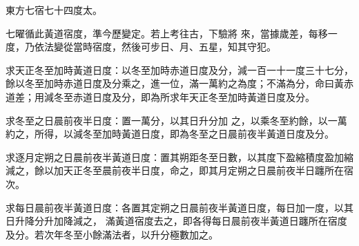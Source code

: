 \begin{pinyinscope}
 東方七宿七十四度太。



 七曜循此黃道宿度，準今歷變定。若上考往古，下驗將
 來，當據歲差，每移一度，乃依法變從當時宿度，然後可步日、月、五星，知其守犯。



 求天正冬至加時黃道日度：以冬至加時赤道日度及分，減一百一十一度三十七分，餘以冬至加時赤道日度及分乘之，進一位，滿一萬約之為度；不滿為分，命曰黃赤道差；用減冬至赤道日度及分，即為所求年天正冬至加時黃道日度及分。



 求冬至之日晨前夜半日度：置一萬分，以其日升分加
 之，以乘冬至約餘，以一萬約之，所得，以減冬至加時黃道日度，即為冬至之日晨前夜半黃道日度及分。



 求逐月定朔之日晨前夜半黃道日度：置其朔距冬至日數，以其度下盈縮積度盈加縮減之，餘以加天正冬至晨前夜半日度，命之，即其月定朔之日晨前夜半日躔所在宿次。



 求每日晨前夜半黃道日度：各置其定朔之日晨前夜半黃道日度，每日加一度，以其日升降分升加降減之，
 滿黃道宿度去之，即各得每日晨前夜半黃道日躔所在宿度及分。若次年冬至小餘滿法者，以升分極數加之。



\end{pinyinscope}